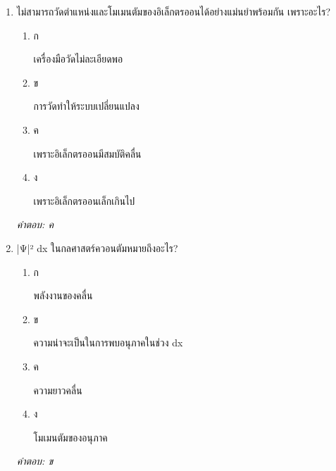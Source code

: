 \documentclass[12pt]{article}
\begin{document}
\begin{enumerate}[label=\arabic*., itemsep=0.5\baselineskip, topsep=0.5\baselineskip, leftmargin=*]
\item ไม่สามารถวัดตำแหน่งและโมเมนตัมของอิเล็กตรออนได้อย่างแม่นยำพร้อมกัน เพราะอะไร?
\begin{enumerate}[label=\alph*)., itemsep=0.3\baselineskip, topsep=0.3\baselineskip]
\item ก\ 
\begin{minipage}[t]{0.9\linewidth}
\raggedright เครื่องมือวัดไม่ละเอียดพอ
\end{minipage}
\item ข\ 
\begin{minipage}[t]{0.9\linewidth}
\raggedright การวัดทำให้ระบบเปลี่ยนแปลง
\end{minipage}
\item ค\ 
\begin{minipage}[t]{0.9\linewidth}
\raggedright เพราะอิเล็กตรออนมีสมบัติคลื่น
\end{minipage}
\item ง\ 
\begin{minipage}[t]{0.9\linewidth}
\raggedright เพราะอิเล็กตรออนเล็กเกินไป
\end{minipage}
\end{enumerate}
\vspace{-0.3\baselineskip}
\begin{small}
\textit{คำตอบ: ค}
\end{small}

\item |Ψ|² dx ในกลศาสตร์ควอนตัมหมายถึงอะไร?
\begin{enumerate}[label=\alph*)., itemsep=0.3\baselineskip, topsep=0.3\baselineskip]
\item ก\ 
\begin{minipage}[t]{0.9\linewidth}
\raggedright พลังงานของคลื่น
\end{minipage}
\item ข\ 
\begin{minipage}[t]{0.9\linewidth}
\raggedright ความน่าจะเป็นในการพบอนุภาคในช่วง dx
\end{minipage}
\item ค\ 
\begin{minipage}[t]{0.9\linewidth}
\raggedright ความยาวคลื่น
\end{minipage}
\item ง\ 
\begin{minipage}[t]{0.9\linewidth}
\raggedright โมเมนตัมของอนุภาค
\end{minipage}
\end{enumerate}
\vspace{-0.3\baselineskip}
\begin{small}
\textit{คำตอบ: ข}
\end{small}


\end{enumerate}
\end{document}
